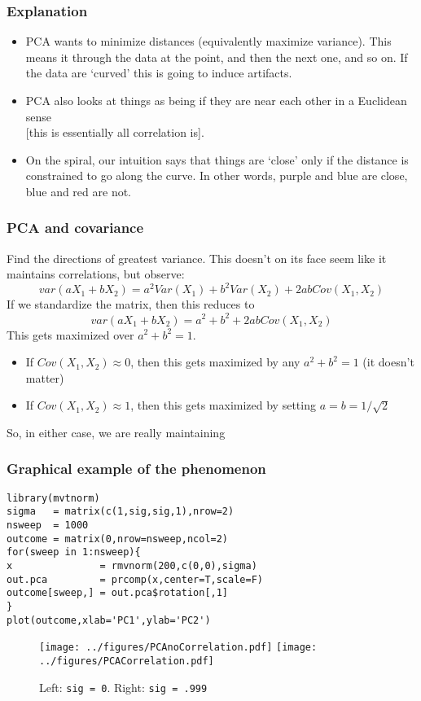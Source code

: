 \documentclass{beamer}
\begin{document}
\begin{frame}[fragile]
  \frametitle{Explanation}
  \begin{itemize}
  \item PCA wants to minimize distances (equivalently maximize
    variance).  This means it  through the data at the
     point, and then the next one, and so on.  If the data are
    `curved' this is going to induce artifacts.  
  \item PCA also looks at things as being  if they are near each
    other in a Euclidean sense \\
    {\scriptsize [this is essentially  all correlation is]}.  
    
  \item On the spiral, our intuition says
    that things are `close' only if the distance is constrained to go
    along the curve.  In other words, purple and blue are close, blue and
    red are not. 
  \end{itemize}
\end{frame}

\begin{frame}
\frametitle{PCA and covariance}

 Find the directions of greatest variance.  This doesn't on its
face seem like it maintains correlations, but observe:
\[
var(aX_1 +bX_2) = a^2 Var(X_1)+ b^2 Var(X_2) + 2abCov(X_1,X_2)
\]
If we standardize the matrix, then this reduces to
\[
var(aX_1 +bX_2) = a^2 + b^2 + 2abCov(X_1,X_2)
\]
This gets maximized over $a^2 + b^2 = 1$.  
\begin{itemize}
\item If $Cov(X_1,X_2) \approx 0$, then this gets maximized
by any $a^2+b^2 = 1$ (it doesn't matter)
\item If $Cov(X_1,X_2) \approx 1$, then this gets maximized 
by setting $a=b = 1/\sqrt{2}$
\end{itemize}
So, in either case, we are really maintaining 
\end{frame}

\begin{frame}[fragile]
\frametitle{Graphical example of the phenomenon}
\scriptsize
\begin{verbatim}
library(mvtnorm)
sigma   = matrix(c(1,sig,sig,1),nrow=2)
nsweep  = 1000
outcome = matrix(0,nrow=nsweep,ncol=2)
for(sweep in 1:nsweep){
x               = rmvnorm(200,c(0,0),sigma)
out.pca         = prcomp(x,center=T,scale=F)
outcome[sweep,] = out.pca$rotation[,1]
}
plot(outcome,xlab='PC1',ylab='PC2')
\end{verbatim}

\begin{figure}[h]
   \centering
   \texttt{[image: ../figures/PCAnoCorrelation.pdf]}
   \texttt{[image: ../figures/PCACorrelation.pdf]} 
   \caption{Left: {\tt sig = 0}. Right: {\tt sig = .999}}
\end{figure}
\end{frame}
\end{document}
